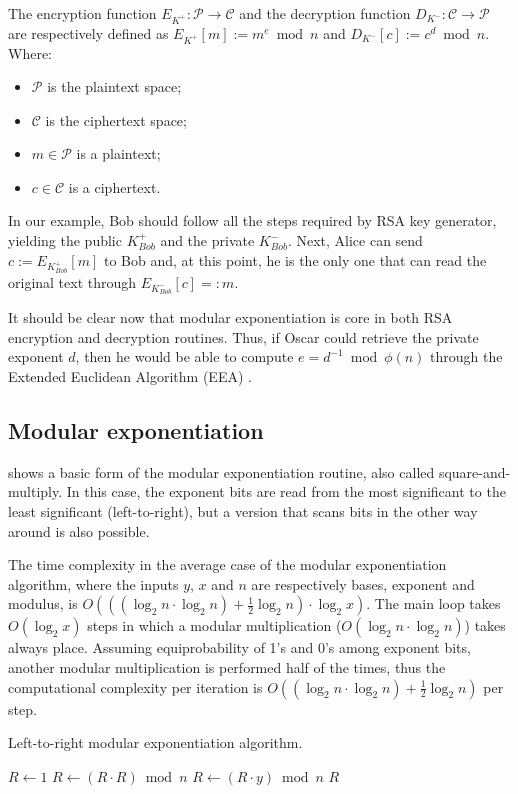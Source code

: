 The encryption function $E_{K^+}: \mathcal{P} \rightarrow \mathcal{C}$ and the decryption function $D_{K^-}: \mathcal{C} \rightarrow \mathcal{P}$ are respectively defined as $E_{K^+}[m] := m^e \bmod n$ and $D_{K^-}[c] := c^d \bmod n$. Where:
\begin{itemize}
\item $\mathcal{P}$ is the plaintext space;
\item $\mathcal{C}$ is the ciphertext space;
\item $m \in \mathcal{P}$ is a plaintext;
\item $c \in \mathcal{C}$ is a ciphertext.
\end{itemize}

In our example, Bob should follow all the steps required by RSA key generator, yielding the public $K^+_{Bob}$ and the private $K^-_{Bob}$. Next, Alice can send $c := E_{K^+_{Bob}}[m]$ to Bob and, at this point, he is the only one that can read the original text through $E_{K^-_{Bob}}[c] =: m$.

It should be clear now that modular exponentiation is core in both RSA encryption and decryption routines. Thus, if Oscar could retrieve the private exponent $d$, then he would be able to compute $e = d^{-1} \bmod \phi(n)$ through the Extended Euclidean Algorithm (EEA) \cite{bib:boreale}.

\subsection{Modular exponentiation}

 shows a basic form of the modular exponentiation routine, also called square-and-multiply. In this case, the exponent bits are read from the most significant to the least significant (left-to-right), but a version that scans bits in the other way around is also possible.

The time complexity in the average case of the modular exponentiation algorithm, where the inputs $y$, $x$ and $n$ are respectively bases, exponent and modulus, is $O(((\log_2n \cdot \log_2n) + \frac{1}{2} \log_2n) \cdot \log_2x)$. The main loop takes $O(\log_2x)$ steps in which a modular multiplication ($O(\log_2n \cdot \log_2n)$) takes always place. Assuming equiprobability of 1's and 0's among exponent bits, another modular multiplication is performed half of the times, thus the computational complexity per iteration is $O((\log_2n \cdot \log_2n) + \frac{1}{2} \log_2n)$ per step.

\begin{algorithm}
\caption{Left-to-right modular exponentiation algorithm.}\label{alg:one}
\begin{algorithmic}[1]
  \State $R \leftarrow 1$\;
    \State $R \leftarrow (R \cdot R) \bmod n$\;
      \State $R \leftarrow (R \cdot y) \bmod n$\;
    \EndIf
  \EndFor
  \State \Return $R$
\EndFunction
\end{algorithmic}
\end{algorithm}

